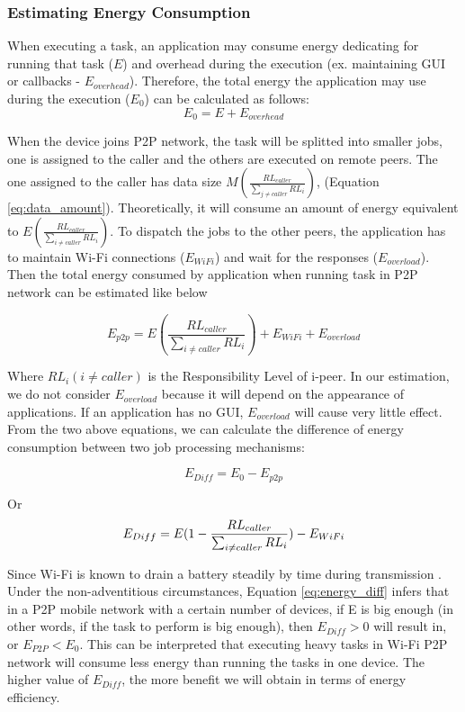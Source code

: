 \documentclass{sig-alternate}
\begin{document}
\subsubsection{Estimating Energy Consumption}
When executing a task, an application may consume energy dedicating for running that task ($E$) and overhead during the execution (ex. maintaining GUI or callbacks - $E_{overhead}$). Therefore, the total energy the application may use during the execution ($E_{0}$) can be calculated as follows:
$$E_{0} = E + E_{overhead}$$

When the device joins P2P network, the task will be splitted into smaller jobs, one is assigned to the caller and the others are executed on remote peers. The one assigned to the caller has data size $M(\frac{RL_{caller}}{\sum_{j \neq caller}{RL_{i}}})$, (Equation \ref{eq:data_amount}). Theoretically, it will consume an amount of energy equivalent to $E(\frac{RL_{caller}}{\sum_{i \neq caller}{RL_{i}}})$. To dispatch the jobs to the other peers, the application has to maintain Wi-Fi connections ($E_{WiFi}$) and wait for the responses ($E_{overload}$). Then the total energy consumed by application when running task in P2P network can be estimated like below

\begin{small} $$E_{p2p} = E(\frac{RL_{caller}}{\sum_{i \neq caller}{RL_{i}}}) + E_{WiFi} + E_{overload}$$  \end{small}

Where $RL_{i} (i \neq caller)$ is the Responsibility Level of i-peer. In our estimation, we do not consider $E_{overload}$ because it will depend on the appearance of applications. If an application has no GUI, $E_{overload}$ will cause very little effect. From the two above equations, we can calculate the difference of energy consumption between two job processing mechanisms:

\begin{small} $$E_{Diff} = E_{0} - E_{p2p}$$ \end{small} Or 
\begin{equation}
\label{eq:energy_diff} \small
E_{Diff} = E(1 - \frac{RL_{caller}}{\sum_{i \neq caller}{RL_{i}}}) - E_{WiFi}
\end{equation}

Since Wi-Fi is known to drain a battery steadily by time during transmission \cite{wifi_energy}. Under the non-adventitious circumstances, Equation \ref{eq:energy_diff} infers that in a P2P mobile network with a certain number of devices, if E is big enough (in other words, if the task to perform is big enough), then $E_{Diff} > 0$ will result in, or $E_{P2P} < E_{0}$. This can be interpreted that executing heavy tasks in Wi-Fi P2P network will consume less energy than running the tasks in one device. The higher value of $E_{Diff}$, the more benefit we will obtain in terms of energy efficiency.
\end{document}
